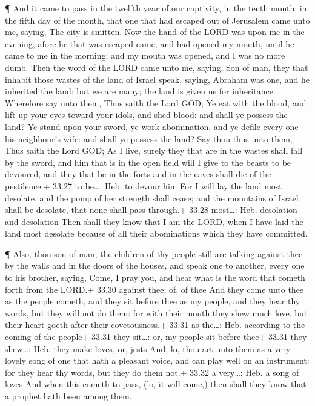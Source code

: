  ¶ And it came to pass in the twelfth year of our
captivity, in the tenth month, in the fifth day of the month, that one
that had escaped out of Jerusalem came unto me, saying, The city is
smitten.  Now the hand of the LORD was upon me in the
evening, afore he that was escaped came; and had opened my mouth, until
he came to me in the morning; and my mouth was opened, and I was no more
dumb.  Then the word of the LORD came unto me, saying,
 Son of man, they that inhabit those wastes of the land of
Israel speak, saying, Abraham was one, and he inherited the land: but we
are many; the land is given us for inheritance.  Wherefore
say unto them, Thus saith the Lord GOD; Ye eat with the blood, and lift
up your eyes toward your idols, and shed blood: and shall ye possess the
land?  Ye stand upon your sword, ye work abomination, and
ye defile every one his neighbour's wife: and shall ye possess the land?
 Say thou thus unto them, Thus saith the Lord GOD; As I
live, surely they that are in the wastes shall fall by the sword, and
him that is in the open field will I give to the beasts to be devoured,
and they that be in the forts and in the caves shall die of the
pestilence.+ 33.27 to be\ldots: Heb. to devour him  For I
will lay the land most desolate, and the pomp of her strength shall
cease; and the mountains of Israel shall be desolate, that none shall
pass through.+ 33.28 most\ldots: Heb. desolation and desolation
 Then shall they know that I am the LORD, when I have laid
the land most desolate because of all their abominations which they have
committed.

 ¶ Also, thou son of man, the children of thy people still
are talking against thee by the walls and in the doors of the houses,
and speak one to another, every one to his brother, saying, Come, I pray
you, and hear what is the word that cometh forth from the LORD.+ 33.30
against thee: of, of thee  And they come unto thee as the
people cometh, and they sit before thee as my people, and they hear thy
words, but they will not do them: for with their mouth they shew much
love, but their heart goeth after their covetousness.+ 33.31 as
the\ldots: Heb. according to the coming of the people+ 33.31 they
sit\ldots: or, my people sit before thee+ 33.31 they shew\ldots: Heb.
they make loves, or, jests  And, lo, thou art unto them as
a very lovely song of one that hath a pleasant voice, and can play well
on an instrument: for they hear thy words, but they do them not.+ 33.32
a very\ldots: Heb. a song of loves  And when this cometh to
pass, (lo, it will come,) then shall they know that a prophet hath been
among them.

